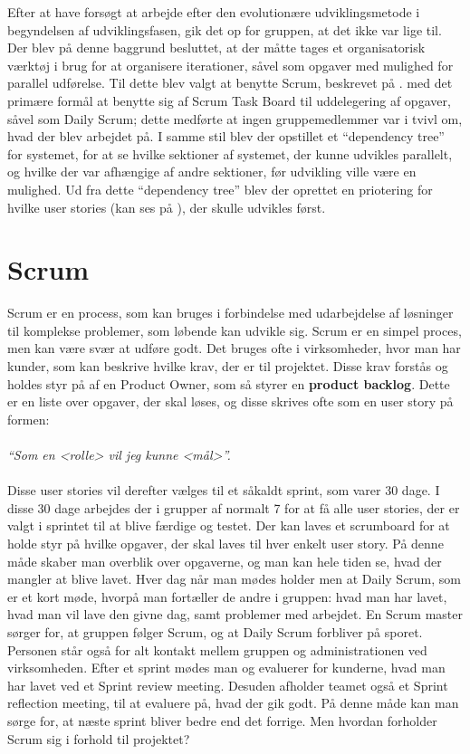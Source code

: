 Efter at have forsøgt at arbejde efter den evolutionære udviklingsmetode i begyndelsen af udviklingsfasen, gik det op for gruppen, at det ikke var lige til.
Der blev på denne baggrund besluttet, at der måtte tages et organisatorisk værktøj i brug for at organisere iterationer, såvel som opgaver med mulighed for parallel udførelse.
Til dette blev valgt at benytte Scrum, beskrevet på . med det primære formål at benytte sig af Scrum Task Board til uddelegering af opgaver, såvel som Daily Scrum; dette medførte at ingen gruppemedlemmer var i tvivl om, hvad der blev arbejdet på.
I samme stil blev der opstillet et ``dependency tree'' for systemet, for at se hvilke sektioner af systemet, der kunne udvikles parallelt, og hvilke der var afhængige af andre sektioner, før udvikling ville være en mulighed.
Ud fra dette ``dependency tree'' blev der oprettet en priotering for hvilke user stories (kan ses på ), der skulle udvikles først.

\section{Scrum}\label{scrum}
Scrum er en process, som kan bruges i forbindelse med udarbejdelse af løsninger til komplekse problemer, som løbende kan udvikle sig. 
Scrum er en simpel proces, men kan være svær at udføre godt.
Det bruges ofte i virksomheder, hvor man har kunder, som kan beskrive hvilke krav, der er til projektet.
Disse krav forstås og holdes styr på af en Product Owner, som så styrer en \textbf{product backlog}.
Dette er en liste over opgaver, der skal løses, og disse skrives ofte som en user story på formen:\\ \\ \textit{``Som en <rolle> vil jeg kunne <mål>''. }\\ \\
Disse user stories vil derefter vælges til et såkaldt sprint, som varer 30 dage. 
I disse 30 dage arbejdes der i grupper af normalt 7 for at få alle user stories, der er valgt i sprintet til at blive færdige og testet.
Der kan laves et scrumboard for at holde styr på hvilke opgaver, der skal laves til hver enkelt user story. 
På denne måde skaber man overblik over opgaverne, og man kan hele tiden se, hvad der mangler at blive lavet.
Hver dag når man mødes holder men at Daily Scrum, som er et kort møde, hvorpå man fortæller de andre i gruppen: hvad man har lavet, hvad man vil lave den givne dag, samt problemer med arbejdet.
En Scrum master sørger for, at gruppen følger Scrum, og at Daily Scrum forbliver på sporet. 
Personen står også for alt kontakt mellem gruppen og administrationen ved virksomheden.
Efter et sprint mødes man og evaluerer for kunderne, hvad man har lavet ved et Sprint review meeting.
Desuden afholder teamet også et Sprint reflection meeting, til at evaluere på, hvad der gik godt.
På denne måde kan man sørge for, at næste sprint bliver bedre end det forrige. 
Men hvordan forholder Scrum sig i forhold til projektet?

